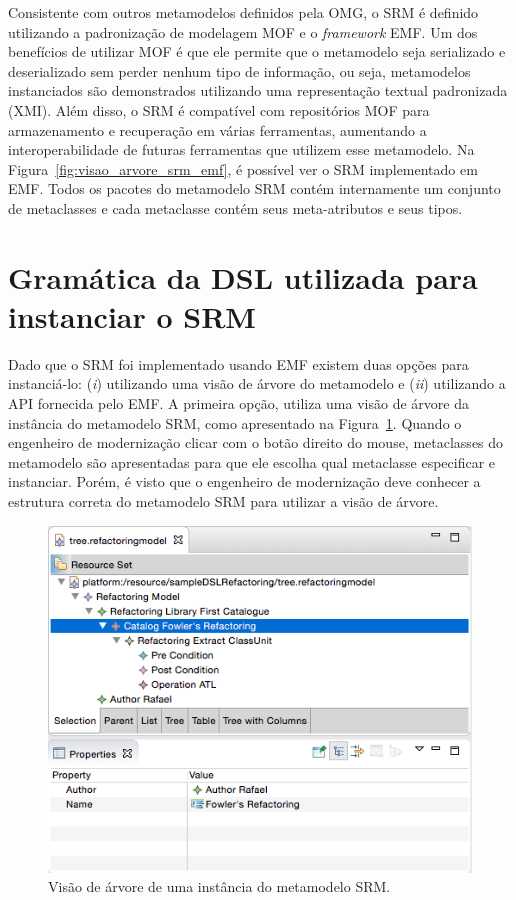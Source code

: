 Consistente com outros metamodelos definidos pela OMG, o SRM é definido utilizando a padronização de modelagem MOF e o \textit{framework} EMF. Um dos benefícios de utilizar MOF é que ele permite que o metamodelo seja serializado e deserializado sem perder nenhum tipo de informação, ou seja, metamodelos instanciados são demonstrados utilizando uma representação textual padronizada (XMI). Além disso, o SRM é compatível com repositórios MOF para armazenamento e recuperação em várias ferramentas, aumentando a interoperabilidade de futuras ferramentas que utilizem esse metamodelo. 
Na Figura~\ref{fig:visao_arvore_srm_emf}, é possível ver o SRM implementado em EMF. Todos os pacotes do metamodelo SRM contém internamente um conjunto de metaclasses e cada metaclasse contém seus meta-atributos e seus tipos.

\section{Gramática da DSL utilizada para instanciar o SRM}

Dado que o SRM foi implementado usando EMF existem duas opções para instanciá-lo: (\textit{i}) utilizando uma visão de árvore do metamodelo e (\textit{ii}) utilizando a API fornecida pelo EMF. A primeira opção, utiliza uma visão de árvore da instância do metamodelo SRM, como apresentado na Figura~\ref{fig:visao_arvore_metamodelo_srm}. Quando o engenheiro de modernização clicar com o botão direito do mouse, metaclasses do metamodelo são apresentadas para que ele escolha qual metaclasse especificar e instanciar. Porém, é visto que o engenheiro de modernização deve conhecer a estrutura correta do metamodelo SRM para utilizar a visão de árvore. 

\begin{figure}[h]
	\centering
	\caption{Visão de árvore de uma instância do metamodelo SRM.}
	\label{fig:visao_arvore_metamodelo_srm}
	\includegraphics[scale=0.65]{images/tree_srm}
	\fautor
\end{figure}

